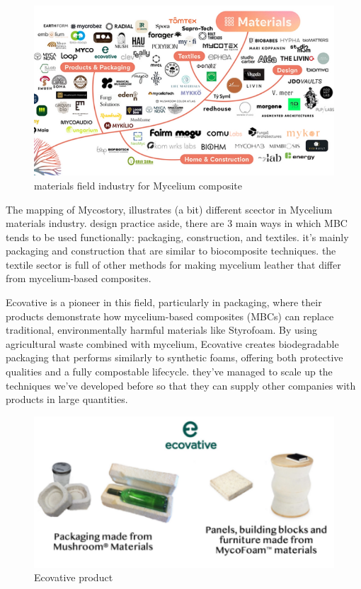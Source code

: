 \begin{figure}[h]
    \centering
    \includegraphics{images/mycelium-indus-tree.png}
    \caption{materials field industry for Mycelium composite}
    \label{fig:indus-tree}
\end{figure}

The mapping of Mycostory, illustrates (a bit) different scector in Mycelium materials industry. design practice aside, there are 3 main ways in which MBC tends to be used functionally: packaging, construction, and textiles. 
it's mainly packaging and construction that are similar to biocomposite techniques. the textile sector is full of other methods for making mycelium leather that differ from mycelium-based composites. 



Ecovative is a pioneer in this field, particularly in packaging, where their products demonstrate how mycelium-based composites (MBCs) can replace traditional, environmentally harmful materials like Styrofoam. By using agricultural waste combined with mycelium, Ecovative creates biodegradable packaging that performs similarly to synthetic foams, offering both protective qualities and a fully compostable lifecycle. they've managed to scale up the techniques we've developed before so that they can supply other companies with products in large quantities. 
\begin{figure}[h]
    \centering
    \includegraphics{images/ecovative.png}
    \caption{Ecovative product}
    \label{fig:ecovative}
\end{figure} 


